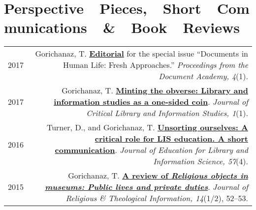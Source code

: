\documentclass[letterpaper,11pt]{article}
\begin{document}
\section*{Perspective~~Pieces,~~Short~~Communications~~\&~~Bo{}ok~~Reviews}
\begin{longtable}{ @{} L @{} R @{} }
2017&	Gorichanaz, T. \href{http://ideaexchange.uakron.edu/docam/vol4/iss1/1/}{\textbf{Editorial}} for the special issue ``Documents in Human Life: Fresh Approaches.'' \emph{Proceedings from the Document Academy, 4}(1). \\[1em]

2017&	Gorichanaz, T. \href{http://libraryjuicepress.com/journals/index.php/jclis/article/view/7}{\textbf{Minting the obverse: Library and information studies as a one-sided coin}}. \emph{Journal of Critical Library and Information Studies, 1}(1). \\[1em]

2016&	Turner, D., and Gorichanaz, T. \href{http://dpi-journals.com/index.php/JELIS/article/view/1972}{\textbf{Unsorting ourselves: A critical role for LIS education. A short communication}}. \emph{Journal of Education for Library and Information Science, 57}(4).  \\[1em]

2015&	Gorichanaz, T. \href{http://dx.doi.org/10.1080/10477845.2015.1020742}{\textbf{A review of \emph{Religious objects in museums: Public lives and private duties}}}. \emph{Journal of Religious \& Theological Information, 14}(1/2), 52--53.	

\end{longtable}

\end{document}
